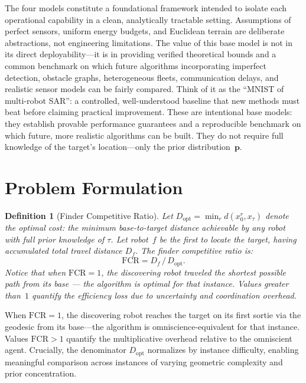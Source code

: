 \documentclass[conference]{IEEEtran}
\newtheorem{definition}{Definition}
\begin{document}
The four models constitute a foundational framework intended to isolate each
operational capability in a clean, analytically tractable setting.
Assumptions of perfect sensors, uniform energy budgets, and Euclidean terrain
are deliberate abstractions, not engineering limitations.
The value of this base model is not in its direct deployability---it is in
providing verified theoretical bounds and a common benchmark on which future
algorithms incorporating imperfect detection, obstacle graphs, heterogeneous
fleets, communication delays, and realistic sensor models can be fairly
compared.
Think of it as the ``MNIST of multi-robot SAR'': a controlled,
well-understood baseline that new methods must beat before claiming
practical improvement.
These are intentional base models: they establish provable performance
guarantees and a reproducible benchmark on which future, more realistic
algorithms can be built.
They do not require full knowledge of the target's location---only the
prior distribution~$\mathbf{p}$.

\section{Problem Formulation}\label{sec:problem}

\begin{definition}[Finder Competitive Ratio]
Let $D_{\mathrm{opt}} = \min_r d(x_0^r, x_\tau)$ denote the
\emph{optimal cost}: the minimum base-to-target distance achievable by any
robot with full prior knowledge of $\tau$.
Let robot~$f$ be the first to locate the target, having accumulated total
travel distance $D_f$.
The finder competitive ratio is:
\begin{equation}
  \mathrm{FCR} = D_f \,/\, D_{\mathrm{opt}}.
  \label{eq:fcr}
\end{equation}
Notice that when $\mathrm{FCR} = 1$, the discovering robot traveled the shortest
possible path from its base --- the algorithm is optimal for that instance.
Values greater than~$1$ quantify the efficiency loss due to uncertainty and
coordination overhead.
\end{definition}

When $\mathrm{FCR} = 1$, the discovering robot reaches the target on its
first sortie via the geodesic from its base---the algorithm is
omniscience-equivalent for that instance.
Values $\mathrm{FCR} > 1$ quantify the multiplicative overhead relative to
the omniscient agent.
Crucially, the denominator $D_{\mathrm{opt}}$ normalizes by instance
difficulty, enabling meaningful comparison across instances of varying
geometric complexity and prior concentration.
\end{document}
